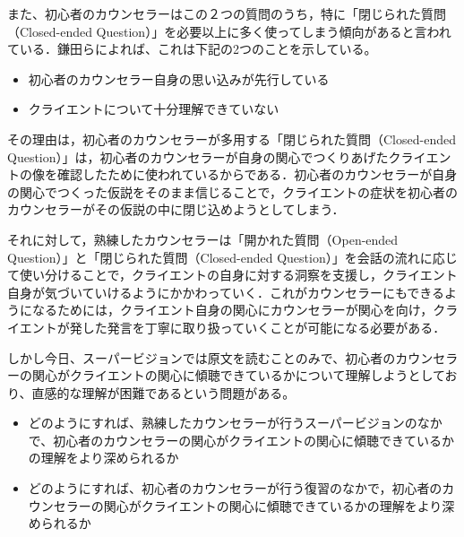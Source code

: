 \documentclass[shuuron]{kuee}
\begin{document}
また、初心者のカウンセラーはこの２つの質問のうち，特に「閉じられた質問（Closed-ended Question）」を必要以上に多く使ってしまう傾向があると言われている．鎌田ら\cite{Darshana}によれば、これは下記の2つのことを示している。
\begin{itemize}
  \item 初心者のカウンセラー自身の思い込みが先行している
  \item クライエントについて十分理解できていない
\end{itemize}
その理由は，初心者のカウンセラーが多用する「閉じられた質問（Closed-ended Question）」は，初心者のカウンセラーが自身の関心でつくりあげたクライエントの像を確認したために使われているからである．初心者のカウンセラーが自身の関心でつくった仮説をそのまま信じることで，クライエントの症状を初心者のカウンセラーがその仮説の中に閉じ込めようとしてしまう．

それに対して，熟練したカウンセラーは「開かれた質問（Open-ended Question）」と「閉じられた質問（Closed-ended Question）」を会話の流れに応じて使い分けることで，クライエントの自身に対する洞察を支援し，クライエント自身が気づいていけるようにかかわっていく．これがカウンセラーにもできるようになるためには，クライエント自身の関心にカウンセラーが関心を向け，クライエントが発した発言を丁寧に取り扱っていくことが可能になる必要がある．

しかし今日、スーパービジョンでは原文を読むことのみで、初心者のカウンセラーの関心がクライエントの関心に傾聴できているかについて理解しようとしており、直感的な理解が困難であるという問題がある。
\begin{itemize}
  \item どのようにすれば、熟練したカウンセラーが行うスーパービジョンのなかで、初心者のカウンセラーの関心がクライエントの関心に傾聴できているかの理解をより深められるか
  \item どのようにすれば、初心者のカウンセラーが行う復習のなかで，初心者のカウンセラーの関心がクライエントの関心に傾聴できているかの理解をより深められるか
\end{itemize}



\end{document}
